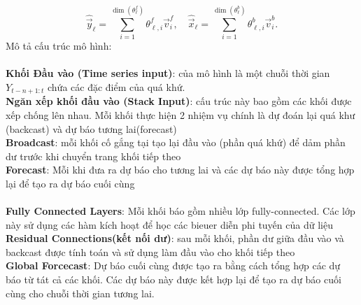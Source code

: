 \[\widehat{\vec{y}}_{\ell} = \sum_{i=1}^{\dim(\theta^f_{\ell})} \theta^f_{\ell,i} \vec{v}^f_{i}, \quad  \widehat{\vec{x}}_{\ell} = \sum_{i=1}^{\dim(\theta^b_{\ell})} \theta^b_{\ell,i} \vec{v}^b_{i}.
\]
Mô tả cấu trúc mô hình: \\
\\
\textbf{Khối Đầu vào (Time series input)}: của mô hình là một chuỗi thời gian \(Y_{t-n+1:t}\) chứa các đặc điểm của quá khứ.\\
\textbf{Ngăn xếp khối đầu vào (Stack Input)}: cấu trúc này bao gồm các khối được xếp chống lên nhau. Mỗi khối thực hiện 2 nhiệm vụ chính là dự đoán lại quá khư (backcast) và dự báo tương lai(forecast)\\
\textbf{Broadcast}: mỗi khối cố  gắng tại tạo lại đầu vào (phần quá khứ) để dảm phần dư trước khi chuyển trang khối tiếp theo\\
\textbf{Forecast}: Mỗi khi đưa ra dự báo cho tương lai và các dự báo này được tổng hợp lại để tạo ra dự báo cuối cùng\\
\\
\textbf{Fully Connected Layers}: Mỗi khối báo gồm nhiều lớp fully-connected. Các lớp này sử dụng các hàm kích hoạt để học các bieuer diễn phi tuyến của dữ liệu\\
\textbf{Residual Connections(kết nối dư)}: sau mỗi khối, phần dư giữa đầu vào và backcast được tính toán và sử dụng làm đầu vào cho khối tiếp theo\\
\textbf{Global Forcecast}: Dự báo cuối cùng được tạo ra bằng cách tổng hợp các dự báo từ tát cả các khối. Các dự báo này được kết hợp lại để tạo ra dự báo cuối cùng cho chuỗi thời gian tương lai.\\
